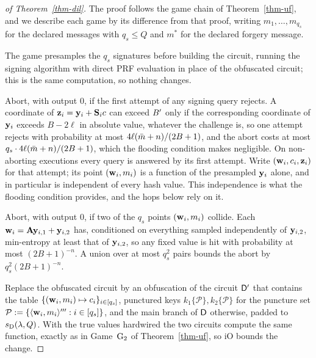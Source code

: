 \begin{proof}[of Theorem~\ref{thm-dil}]
The proof follows the game chain of Theorem~\ref{thm-uf}, and we describe each game by its difference from that proof, writing $m_1, \ldots, m_{q_s}$ for the declared messages with $q_s \le Q$ and $m^*$ for the declared forgery message.

 The game presamples the $q_s$ signatures before building the circuit, running the signing algorithm with direct PRF evaluation in place of the obfuscated circuit; this is the same computation, so nothing changes.

 Abort, with output 0, if the first attempt of any signing query rejects. A coordinate of $\mathbf{z}_i = \mathbf{y}_i + \mathbf{S}_ic$ can exceed $B'$ only if the corresponding coordinate of $\mathbf{y}_i$ exceeds $B - 2\ell$ in absolute value, whatever the challenge is, so one attempt rejects with probability at most $4\ell(\bar m+n)/(2B+1)$, and the abort costs at most $q_s \cdot 4\ell(\bar m+n)/(2B+1)$, which the flooding condition makes negligible. On non-aborting executions every query is answered by its first attempt. Write $(\mathbf{w}_i, c_i, \mathbf{z}_i)$ for that attempt; its point $(\mathbf{w}_i, m_i)$ is a function of the presampled $\mathbf{y}_i$ alone, and in particular is independent of every hash value. This independence is what the flooding condition provides, and the hops below rely on it.

 Abort, with output 0, if two of the $q_s$ points $(\mathbf{w}_i, m_i)$ collide. Each $\mathbf{w}_i = \mathbf{A}\mathbf{y}_{i,1} + \mathbf{y}_{i,2}$ has, conditioned on everything sampled independently of $\mathbf{y}_{i,2}$, min-entropy at least that of $\mathbf{y}_{i,2}$, so any fixed value is hit with probability at most $(2B+1)^{-n}$. A union over at most $q_s^2$ pairs bounds the abort by $q_s^2 (2B+1)^{-n}$.

 Replace the obfuscated circuit by an obfuscation of the circuit $\mathsf{D}'$ that contains the table $\{(\mathbf{w}_i, m_i) \mapsto c_i\}_{i \in [q_s]}$, punctured keys $k_1\{\mathcal{P}\}, k_2\{\mathcal{P}\}$ for the puncture set $\mathcal{P} := \{\langle \mathbf{w}_i,m_i \rangle''' : i\in[q_s]\}$, and the main branch of $\mathsf{D}$ otherwise, padded to $s_{\mathrm{D}}(\lambda, Q)$. With the true values hardwired the two circuits compute the same function, exactly as in Game~$\textnormal{G}_2$ of Theorem~\ref{thm-uf}, so iO bounds the change.


\end{proof}
